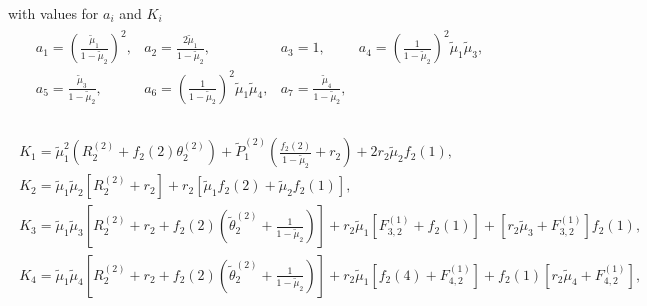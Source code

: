 \documentclass{article}
\begin{document}

with values for $a_{i}$ and $K_{i}$  
\begin{eqnarray}\label{Coefficients.Ais.Exh.uno}
\begin{array}{llll}
a_{1}=\left(\frac{\tilde{\mu}_{1}}{1-\tilde{\mu}_{2}}\right)^{2},&
a_{2}=\frac{2\tilde{\mu}_{1}}{1-\tilde{\mu}_{2}},&
a_{3}=1,&
a_{4}=\left(\frac{1}{1-\tilde{\mu}_{2}}\right)^{2}\tilde{\mu}_{1}\tilde{\mu}_{3},\\
a_{5}=\frac{\tilde{\mu}_{3}}{1-\tilde{\mu}_{2}},&
a_{6}=\left(\frac{1}{1-\tilde{\mu}_{2}}\right)^{2}\tilde{\mu}_{1}\tilde{\mu}_{4},&
a_{7}=\frac{\tilde{\mu}_{4}}{1-\tilde{\mu}_{2}},&\\
\end{array}
\end{eqnarray}%





\begin{eqnarray}\label{Coefficients.kis.Exh.uno}
\begin{array}{l}
K_{1}=\tilde{\mu}_{1}^{2}\left(R_{2}^{(2)}+f_{2}\left(2\right)\theta_{2}^{(2)}\right)
+\tilde{P}_{1}^{(2)}\left(\frac{f_{2}\left(2\right)}{1-\tilde{\mu}_{2}}+r_{2}\right)
+2r_{2}\tilde{\mu}_{2}f_{2}\left(1\right),\\
K_{2}=\tilde{\mu}_{1}\tilde{\mu}_{2}\left[R_{2}^{(2)}
+r_{2}\right]
+r_{2}\left[\tilde{\mu}_{1}f_{2}\left(2\right)
+\tilde{\mu}_{2}f_{2}\left(1\right)\right],\\
K_{3}=\tilde{\mu}_{1}\tilde{\mu}_{3}\left[R_{2}^{(2)}+r_{2}+f_{2}\left(2\right)\left(\tilde{\theta}_{2}^{(2)}+\frac{1}{1-\tilde{\mu}_{2}}\right)\right]
+r_{2}\tilde{\mu}_{1}\left[F_{3,2}^{(1)}+f_{2}\left(1\right)\right]
+\left[r_{2}\tilde{\mu}_{3}+F_{3,2}^{(1)}\right]f_{2}\left(1\right),\\
K_{4}=\tilde{\mu}_{1}\tilde{\mu}_{4}\left[R_{2}^{(2)}
+r_{2}+f_{2}\left(2\right)\left(\tilde{\theta}_{2}^{(2)}
+\frac{1}{1-\tilde{\mu}_{2}}\right)\right]
+r_{2}\tilde{\mu}_{1}\left[f_{2}\left(4\right)+F_{4,2}^{(1)}\right]
+f_{2}\left(1\right)\left[r_{2}\tilde{\mu}_{4}+F_{4,2}^{(1)}\right],
\end{array}
\end{eqnarray}

\newpage
\end{document}
